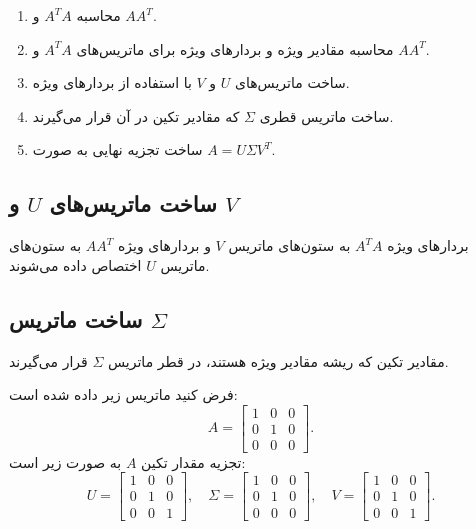 \begin{enumerate}
	\item محاسبه \(A^T A\) و \(A A^T\).
	\item محاسبه مقادیر ویژه و بردارهای ویژه برای ماتریس‌های \(A^T A\) و \(A A^T\).
	\item ساخت ماتریس‌های \(U\) و \(V\) با استفاده از بردارهای ویژه.
	\item ساخت ماتریس قطری \(\Sigma\) که مقادیر تکین در آن قرار می‌گیرند.
	\item ساخت تجزیه نهایی به صورت \(A = U \Sigma V^T\).
\end{enumerate}
\begin{nokteh}
	
	\subsection*{ساخت ماتریس‌های \(U\) و \(V\)}
	بردارهای ویژه \(A^T A\) به ستون‌های ماتریس \(V\) و بردارهای ویژه \(A A^T\) به ستون‌های ماتریس \(U\) اختصاص داده می‌شوند.
\end{nokteh}
\begin{nokteh}
	\subsection*{ساخت ماتریس \(\Sigma\)}
	مقادیر تکین که ریشه مقادیر ویژه هستند، در قطر ماتریس \(\Sigma\) قرار می‌گیرند.
\end{nokteh}
\begin{example}
	
	فرض کنید ماتریس زیر داده شده است:
	\[
	A = \begin{bmatrix}
		1 & 0 & 0 \\
		0 & 1 & 0 \\
		0 & 0 & 0
	\end{bmatrix}.
	\]
	تجزیه مقدار تکین \(A\) به صورت زیر است:
	\[
	U = \begin{bmatrix}
		1 & 0 & 0 \\
		0 & 1 & 0 \\
		0 & 0 & 1
	\end{bmatrix}, \quad
	\Sigma = \begin{bmatrix}
		1 & 0 & 0 \\
		0 & 1 & 0 \\
		0 & 0 & 0
	\end{bmatrix}, \quad
	V = \begin{bmatrix}
		1 & 0 & 0 \\
		0 & 1 & 0 \\
		0 & 0 & 1
	\end{bmatrix}.
	\]
	
\end{example}
